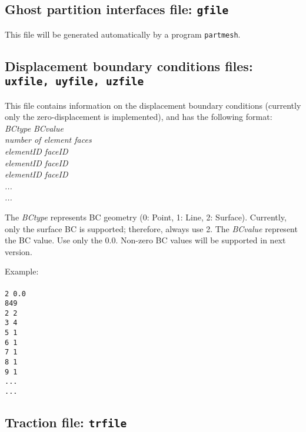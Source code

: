 \subsection{Ghost partition interfaces file: \texttt{gfile}}


This file will be generated automatically by a program \texttt{partmesh}.\\

\subsection{Displacement boundary conditions files: \texttt{uxfile, uyfile, uzfile}}
\label{subsec:dispbc}

This file contains information on the displacement boundary conditions (currently only the zero-displacement is implemented), and has the following format:\\

\emph{BCtype} \emph{BCvalue}\\
\emph{number of element faces}\\
\emph{elementID faceID \\
elementID faceID \\
elementID faceID \\
...\\
...\\}

The \emph{BCtype} represents BC geometry (0: Point, 1: Line, 2: Surface). Currently, only the surface BC is supported; therefore, always use 2. The \emph{BCvalue} represent the BC value. Use only the $0.0$. Non-zero BC values will be supported in next version.

Example:\\
\\
\texttt{2 0.0\\
849\\
2 2\\
3 4\\
5 1\\
6 1\\
7 1\\
8 1\\
9 1\\
...\\
...}\\

\subsection{Traction file: \texttt{trfile}}

